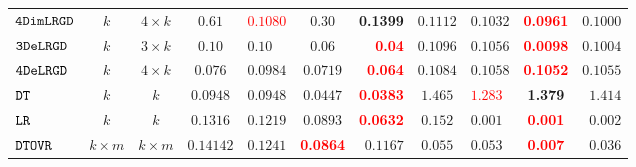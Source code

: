{\begin {table}[t]
\begin{center}
{\begin{tabular}{|| >{\tiny}l || c | c || c | l | c | r || c | l | c | r || }
         \hhline{||-||---||-||--||----||}
         $  \mathtt{ 4DimLRGD }$ & $ k $ & $  4\times k $   & $0.61$   & \textcolor{red}{$0.1080$} & $0.30 $ & \textbf{0.1399} & $0.1112$   & $0.1032$ & \textcolor{red}{\textbf{0.0961}} & $0.1000$  \\
         \hhline{||-||---||-||--||----||}
         $  \mathtt{ 3DeLRGD }$ & $ k $ & $  3\times k $ & $0.10$  & $0.10$ & $0.06$ & \textcolor{red}{\textbf{0.04}} & $0.1096$   & $0.1056$ & \textcolor{red}{\textbf{0.0098}} & $0.1004$  \\
         \hhline{||-||---||-||--||----||}
         $  \mathtt{ 4DeLRGD }$ & $ k $ & $  4\times k $  & $0.076$  & $0.0984$ & $0.0719$ & \textcolor{red}{\textbf{0.064}}  & $0.1084$   & $0.1058$ & \textcolor{red}{\textbf{0.1052}} & $0.1055$   \\
         \hhline{||-||---||-||--||----||}
        $\mathtt{DT}$ & $k$ &  $k$ & $0.0948$  & $0.0948$ & $0.0447$ & \textcolor{red}{\textbf{0.0383}} & $ 1.465$  &  \textcolor{red}{$ 1.283$} & \textbf{1.379 } & {$1.414$}   \\
         \hhline{||-||---||-||--||----||}
         $\mathtt{LR}$ & $k$ &  $k$ & $0.1316$  & $0.1219$ & $ 0.0893$ & \textcolor{red}{\textbf{0.0632}} & $ 0.152$  &  $ 0.001$ & \textcolor{red}{\textbf{0.001}} & {$0.002$}   \\
         \hhline{||-||---||-||--||----||}
        $\mathtt{DTOVR}$ & $k \times m$ &  $ k \times m $  & $0.14142$  & $0.1241$ & \textcolor{red}{\textbf{0.0864}} & $ 0.1167$ &  $0.055$ & $0.053$  &  \textcolor{red}{\textbf{0.007}} & $0.036$  \\

\end{tabular}}
\end{center}
\end{table}}
